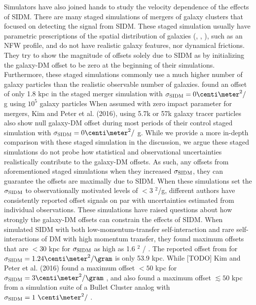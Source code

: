 Simulators have also joined hands to study the velocity dependence of the
effects of SIDM. There are many staged simulations of mergers of galaxy
clusters that focused on detecting the signal from
SIDM. These staged simulation usually have parametric prescriptions of the 
spatial distribution of galaxies  
(\citealt{Randall2008d}, \citealt{Kahlhoefer14}, \citealt{Robertson2016}), 
such as an NFW profile, 
and do not have realistic galaxy features, nor dynamical
frictions. 
They try to show the magnitude of offsets solely due to SIDM \citep{Kahlhoefer14} as 
by initializing the galaxy-DM offset to be zero at the beginning of their 
simulations. 
Furthermore, these staged simulations commonly use a much higher number of 
galaxy particles than the realistic observable number of galaxies. 
\cite{Randall2008d} found an offset of only 1.8 kpc in the staged merger
simulation with $\sigma_{\rm SIDM} = 0 \centi\meter^2 /$ g using $10^5$ 
galaxy particles 
When assumed with zero impact parameter for mergers, Kim and Peter et al.
(2016), using 5.7k or 57k galaxy tracer particles also show 
null galaxy-DM offset during most periods of their control staged simulation 
with $\sigma_{\rm
SIDM} = 0 \centi\meter^2 /$ g. While we provide a more in-depth comparison with
these staged simulation in the discussion, we argue 
these staged simulations do not probe  
how statistical and observational uncertainties realistically contribute to 
the galaxy-DM offsets. 
As such, any offsets 
from aforementioned staged simulations when they increased $\sigma_{\rm
SIDM}$, they can guarantee the offsets are maximally due to SIDM.
When these simulations set the $\sigma_{\rm SIDM}$ to observationally motivated 
levels of $< 3$ \centi\meter$^2$/g, 
different authors have consistently reported offset signals  
on par with uncertainties estimated from individual observations. 
These simulations have raised questions about how strongly the galaxy-DM offsets 
can constrain the effects of SIDM.
When \cite{Kahlhoefer14} simulated SIDM with both low-momentum-transfer 
self-interaction 
and rare self-interactions of DM with high momentum transfer, they found maximum 
offsets that are $< 30$ kpc for $\sigma_{\rm SIDM}$ as high as 1.6
\centi\meter$^2$ / \gram.
The reported offset from \cite{Randall2008d}
for $\sigma_{\rm SIDM} = 1.24 \centi\meter^2 / \gram$ is only 53.9 kpc. 
While [TODO] Kim and Peter et al. (2016) found a maximum offset $< 50$ kpc for 
$\sigma_{\rm SIDM} = 3 \centi\meter^2 / \gram$ ,
and \cite{Robertson2016} also found a maximum offset $\lesssim 50$ kpc  
 from a simulation suite of a Bullet Cluster analog 
 with $\sigma_{\rm SIDM} = 1~\centi\meter^2 /$ \gram.

